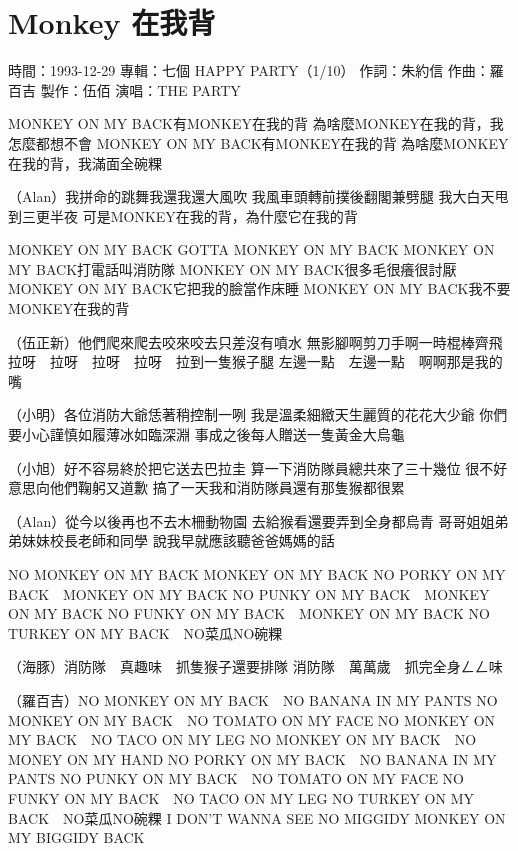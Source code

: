 \documentclass[UTF8,a4paper,oneside,twocolumn,12pt]{ctexbook}
\newcommand{\infopair}[2]{\textbullet #1：#2}
\newcommand{\zc}[1][伍佰]{\infopair{作詞}{#1}}
\newcommand{\zq}[1][伍佰]{\infopair{作曲}{#1}}
\newcommand{\zj}[1]{\infopair{專輯}{#1}}
\newcommand{\zz}[1]{\infopair{製作}{#1}}
\newcommand{\sj}[1]{\infopair{時間}{#1}}
\newenvironment{info}{\begin{flushleft}\kaishu
	}
	{\end{flushleft}\normalsize\yahei\par}
\newenvironment{lyric}{
	}
{}
\begin{document}
\section{Monkey 在我背}
\begin{info}
	\sj{1993-12-29}
	\zj{七個 HAPPY PARTY（1/10）}
	\zc[朱約信]
	\zq[羅百吉]
	\zz{伍佰}
	\infopair{演唱}{THE PARTY}
\end{info}
\begin{lyric}
	MONKEY ON MY BACK有MONKEY在我的背
	為啥麼MONKEY在我的背，我怎麼都想不會
	MONKEY ON MY BACK有MONKEY在我的背
	為啥麼MONKEY在我的背，我滿面全碗粿

	（Alan）我拼命的跳舞我還我還大風吹
	我風車頭轉前撲後翻閣兼劈腿
	我大白天甩到三更半夜
	可是MONKEY在我的背，為什麼它在我的背

	MONKEY ON MY BACK GOTTA MONKEY ON MY BACK
	MONKEY ON MY BACK打電話叫消防隊
	MONKEY ON MY BACK很多毛很癢很討厭
	MONKEY ON MY BACK它把我的臉當作床睡
	MONKEY ON MY BACK我不要MONKEY在我的背

	（伍正新）他們爬來爬去咬來咬去只差沒有噴水
	無影腳啊剪刀手啊一時棍棒齊飛
	拉呀　拉呀　拉呀　拉呀　拉到一隻猴子腿
	左邊一點　左邊一點　啊啊那是我的嘴

	（小明）各位消防大爺恁著稍控制一咧
	我是溫柔細緻天生麗質的花花大少爺
	你們要小心謹慎如履薄冰如臨深淵
	事成之後每人贈送一隻黃金大烏龜

	（小旭）好不容易終於把它送去巴拉圭
	算一下消防隊員總共來了三十幾位
	很不好意思向他們鞠躬又道歉
	搞了一天我和消防隊員還有那隻猴都很累

	（Alan）從今以後再也不去木柵動物園
	去給猴看還要弄到全身都烏青
	哥哥姐姐弟弟妹妹校長老師和同學
	說我早就應該聽爸爸媽媽的話

	NO MONKEY ON MY BACK MONKEY ON MY BACK
	NO PORKY ON MY BACK　MONKEY ON MY BACK
	NO PUNKY ON MY BACK　MONKEY ON MY BACK
	NO FUNKY ON MY BACK　MONKEY ON MY BACK
	NO TURKEY ON MY BACK　NO菜瓜NO碗粿

	（海豚）消防隊　真趣味　抓隻猴子還要排隊
	消防隊　萬萬歲　抓完全身ㄥㄥ味

	（羅百吉）NO MONKEY ON MY BACK　NO BANANA IN MY PANTS
	NO MONKEY ON MY BACK　NO TOMATO ON MY FACE
	NO MONKEY ON MY BACK　NO TACO ON MY LEG
	NO MONKEY ON MY BACK　NO MONEY ON MY HAND
	NO PORKY ON MY BACK　NO BANANA IN MY PANTS
	NO PUNKY ON MY BACK　NO TOMATO ON MY FACE
	NO FUNKY ON MY BACK　NO TACO ON MY LEG
	NO TURKEY ON MY BACK　NO菜瓜NO碗粿
	I DON'T WANNA SEE NO MIGGIDY MONKEY ON MY BIGGIDY BACK
\end{lyric}
\end{document}
